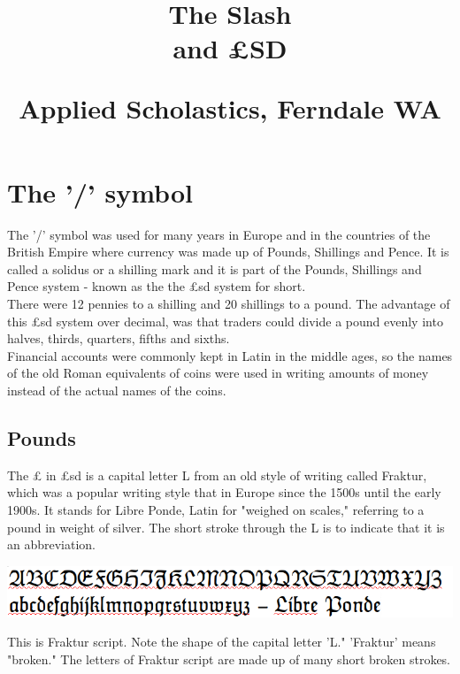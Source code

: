 \documentclass{article}
\author{}
\date{}
\title{The Slash\\and £SD\\
\vspace{28pt}
\begin{normalsize}Applied Scholastics, Ferndale WA \end{normalsize}}
\begin{document}
\maketitle
\newpage

\section*{The '/' symbol}

The '/' symbol was used for many years in Europe and in the countries of the British Empire where currency was made up of Pounds, Shillings and Pence. It is called a solidus or a shilling mark and it is part of the Pounds, Shillings and Pence system - known as the the £sd system for short.\\

There were 12 pennies to a shilling and 20 shillings to a pound. The advantage of this £sd system over decimal, was that traders could divide a pound evenly into halves, thirds, quarters, fifths and sixths.\\

Financial accounts were commonly kept in Latin in the middle ages, so the names of the old Roman equivalents of coins were used in writing amounts of money instead of the actual names of the coins.\\

\newpage

\subsection*{Pounds}
The £ in £sd is a capital letter L from an old style of writing called Fraktur, which was a popular writing style that in Europe since the 1500s until the early 1900s. It stands for Libre Ponde, Latin for "weighed on scales," referring to a pound in weight of silver. The short stroke through the L is to indicate that it is an abbreviation.

\vspace{32pt}
\begin{center}
\includegraphics[width=\linewidth]{"fraktur cropped"}\\
\end{center}

This is Fraktur script. Note the shape of the capital letter 'L." 'Fraktur' means "broken." The letters of Fraktur script are made up of many short broken strokes.\\
\end{document}
